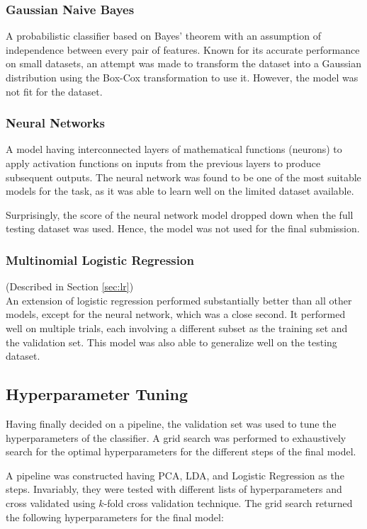 \documentclass[conference]{IEEEtran}
\begin{document}
    \subsubsection{Gaussian Naive Bayes}
    \label{sec:gnb}
    A probabilistic classifier based on Bayes' theorem with an assumption of independence between every pair of features.
    Known for its accurate performance on small datasets, an attempt was made to transform the dataset into a Gaussian distribution using the Box-Cox transformation to use it.
    However, the model was not fit for the dataset.

    \subsubsection{Neural Networks}
    \label{sec:nn}
    A model having interconnected layers of mathematical functions (neurons) to apply activation functions on inputs from the previous layers to produce subsequent outputs.
    The neural network was found to be one of the most suitable models for the task, as it was able to learn well on the limited dataset available.

    Surprisingly, the score of the neural network model dropped down when the full testing dataset was used.
    Hence, the model was not used for the final submission.

    \subsubsection{Multinomial Logistic Regression}
    (Described in Section \ref{sec:lr}) \\
    An extension of logistic regression performed substantially better than all other models, except for the neural network, which
    was a close second.
    It performed well on multiple trials, each involving a different subset as the training set and the validation set.
    This model was also able to generalize well on the testing dataset.

    \subsection{Hyperparameter Tuning}
    \label{sec:hyperparam}
    Having finally decided on a pipeline, the validation set was used to tune the hyperparameters of the classifier.
    A grid search was performed to exhaustively search for the optimal hyperparameters for the different steps of the final model.

    A pipeline was constructed having PCA, LDA, and Logistic Regression as the steps.
    Invariably, they were tested with different lists of hyperparameters and cross validated using $k$-fold cross validation technique.
    The grid search returned the following hyperparameters for the final model:
\end{document}

